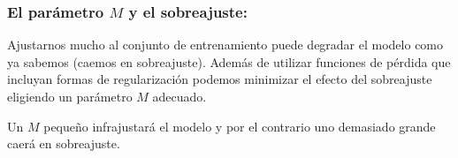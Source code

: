 \subsubsection{El parámetro $M$ y el sobreajuste:}

Ajustarnos mucho al conjunto de entrenamiento puede degradar el modelo como ya sabemos (caemos en sobreajuste). Además de utilizar funciones de pérdida que incluyan formas de regularización podemos minimizar el efecto del sobreajuste eligiendo un parámetro $M$ adecuado.  

Un $M$ pequeño infrajustará el modelo y por el contrario uno demasiado grande caerá en sobreajuste. 



